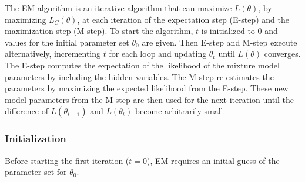 The EM algorithm is an iterative algorithm that can maximize $L(\theta)$, by maximizing $L_C(\theta)$, at each iteration of the expectation step (E-step) and the maximization step (M-step). To start the algorithm, $t$ is initialized to $0$ and values for the initial parameter set $\theta_0$ are given. Then E-step and M-step execute alternatively, incrementing $t$ for each loop and updating $\theta_t$ until $L(\theta)$ converges. The E-step computes the expectation of the likelihood of the mixture model parameters by including the hidden variables. The M-step re-estimates the parameters by maximizing the expected likelihood from the E-step. These new model parameters from the M-step are then used for the next iteration until the difference of $L(\theta_{t+1})$ and $L(\theta_{t})$ become arbitrarily small.

\subsubsection{Initialization}
\label{sec:em_initialization}
Before starting the first iteration ($t=0$), EM requires an initial guess of the parameter set for $\theta_0$. 

